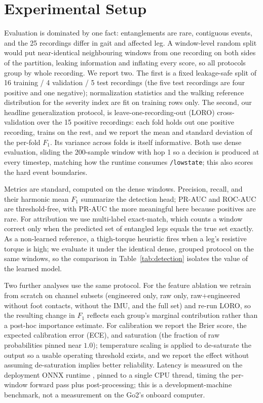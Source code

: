 \section{Experimental Setup}

Evaluation is dominated by one fact: entanglements are rare, contiguous events, and the 25 recordings differ in gait and affected leg. A window-level random split would put near-identical neighbouring windows from one recording on both sides of the partition, leaking information and inflating every score, so all protocols group by whole recording. We report two. The first is a fixed leakage-safe split of 16 training / 4 validation / 5 test recordings (the five test recordings are four positive and one negative); normalization statistics and the walking reference distribution for the severity index are fit on training rows only. The second, our headline generalization protocol, is leave-one-recording-out (LORO) cross-validation over the 15 positive recordings: each fold holds out one positive recording, trains on the rest, and we report the mean and standard deviation of the per-fold $F_1$. Its variance across folds is itself informative. Both use dense evaluation, sliding the 200-sample window with hop 1 so a decision is produced at every timestep, matching how the runtime consumes \texttt{/lowstate}; this also scores the hard event boundaries.

Metrics are standard, computed on the dense windows. Precision, recall, and their harmonic mean $F_1$ summarize the detection head; PR-AUC and ROC-AUC are threshold-free, with PR-AUC the more meaningful here because positives are rare. For attribution we use multi-label exact-match, which counts a window correct only when the predicted set of entangled legs equals the true set exactly. As a non-learned reference, a thigh-torque heuristic fires when a leg's resistive torque is high; we evaluate it under the identical dense, grouped protocol on the same windows, so the comparison in Table~\ref{tab:detection} isolates the value of the learned model.

Two further analyses use the same protocol. For the feature ablation we retrain from scratch on channel subsets (engineered only, raw only, raw+engineered without foot contacts, without the IMU, and the full set) and re-run LORO, so the resulting change in $F_1$ reflects each group's marginal contribution rather than a post-hoc importance estimate. For calibration we report the Brier score, the expected calibration error (ECE), and saturation (the fraction of raw probabilities pinned near $1.0$); temperature scaling \cite{guo2017calibration,niculescu2005predicting} is applied to de-saturate the output so a usable operating threshold exists, and we report the effect without assuming de-saturation implies better reliability. Latency is measured on the deployment ONNX runtime \cite{onnxruntime}, pinned to a single CPU thread, timing the per-window forward pass plus post-processing; this is a development-machine benchmark, not a measurement on the Go2's onboard computer.
